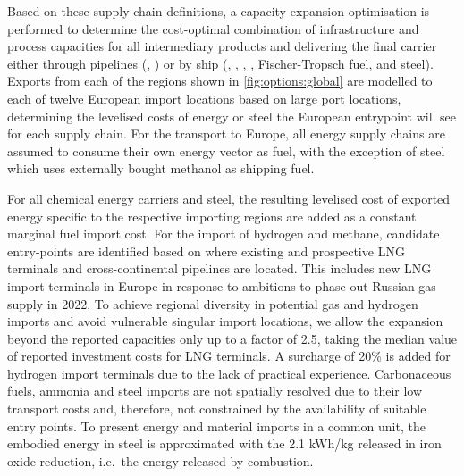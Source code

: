 
Based on these supply chain definitions, a capacity expansion optimisation is
performed to determine the cost-optimal combination of infrastructure and
process capacities for all intermediary products and delivering the final
carrier either through pipelines (, ) or by ship
(, , , , Fischer-Tropsch fuel,
and steel). Exports from each of the regions shown in \cref{fig:options:global}
are modelled to each of twelve European import locations based on large port
locations, determining the levelised costs of energy or steel the European
entrypoint will see for each supply chain. For the transport to Europe, all
energy supply chains are assumed to consume their own energy vector as fuel,
with the exception of steel which uses externally bought methanol as shipping
fuel.


For all chemical energy carriers and steel, the resulting levelised cost of
exported energy specific to the respective importing regions are added as a
constant marginal fuel import cost. For the import of hydrogen and methane,
candidate entry-points are identified based on where existing and prospective
LNG terminals and cross-continental pipelines are located. This includes new LNG
import terminals in Europe in response to ambitions to phase-out Russian gas
supply in 2022.
\cite{instituteforenergyeconomicsandfinancialanalysisEuropeanLNG2023} To achieve
regional diversity in potential gas and hydrogen imports and avoid vulnerable
singular import locations, we allow the expansion beyond the reported capacities
only up to a factor of 2.5, taking the median value of reported investment costs
for LNG terminals.\cite{GlobalGas2022} A surcharge of 20\% is added for hydrogen
import terminals due to the lack of practical experience. Carbonaceous fuels,
ammonia and steel imports are not spatially resolved due to their low transport
costs and, therefore, not constrained by the availability of suitable entry
points. To present energy and material imports in a common unit, the embodied
energy in steel is approximated with the 2.1 kWh/kg released in iron oxide
reduction, i.e.~the energy released by combustion.\cite{kuhnIronRecyclable2022}


